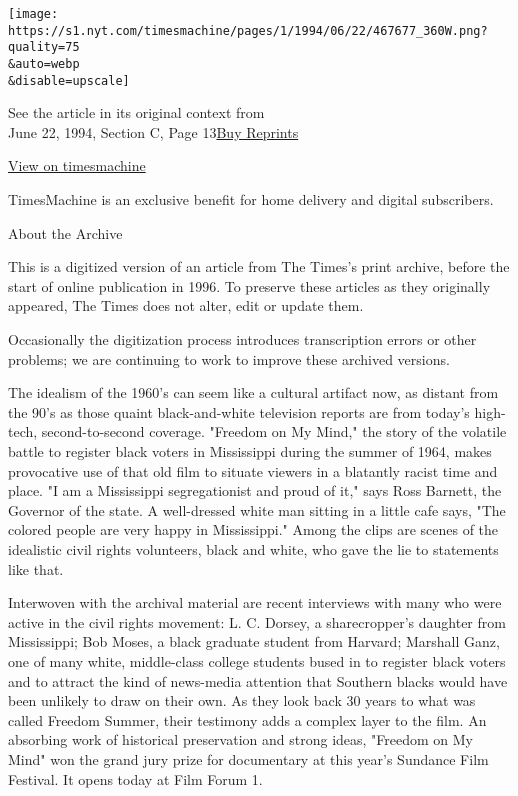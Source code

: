 \texttt{[image: https://s1.nyt.com/timesmachine/pages/1/1994/06/22/467677\_360W.png?quality=75\\\&auto=webp\\\&disable=upscale]}

See the article in its original context from\\
June 22, 1994, Section C, Page
13\href{https://store.nytimes.com/collections/new-york-times-page-reprints?utm_source=nytimes\&utm_medium=article-page\&utm_campaign=reprints}{Buy
Reprints}

\href{http://timesmachine.nytimes.com/timesmachine/1994/06/22/467677.html}{View
on timesmachine}

TimesMachine is an exclusive benefit for home delivery and digital
subscribers.

About the Archive

This is a digitized version of an article from The Times's print
archive, before the start of online publication in 1996. To preserve
these articles as they originally appeared, The Times does not alter,
edit or update them.

Occasionally the digitization process introduces transcription errors or
other problems; we are continuing to work to improve these archived
versions.

The idealism of the 1960's can seem like a cultural artifact now, as
distant from the 90's as those quaint black-and-white television reports
are from today's high-tech, second-to-second coverage. "Freedom on My
Mind," the story of the volatile battle to register black voters in
Mississippi during the summer of 1964, makes provocative use of that old
film to situate viewers in a blatantly racist time and place. "I am a
Mississippi segregationist and proud of it," says Ross Barnett, the
Governor of the state. A well-dressed white man sitting in a little cafe
says, "The colored people are very happy in Mississippi." Among the
clips are scenes of the idealistic civil rights volunteers, black and
white, who gave the lie to statements like that.

Interwoven with the archival material are recent interviews with many
who were active in the civil rights movement: L. C. Dorsey, a
sharecropper's daughter from Mississippi; Bob Moses, a black graduate
student from Harvard; Marshall Ganz, one of many white, middle-class
college students bused in to register black voters and to attract the
kind of news-media attention that Southern blacks would have been
unlikely to draw on their own. As they look back 30 years to what was
called Freedom Summer, their testimony adds a complex layer to the film.
An absorbing work of historical preservation and strong ideas, "Freedom
on My Mind" won the grand jury prize for documentary at this year's
Sundance Film Festival. It opens today at Film Forum 1.

